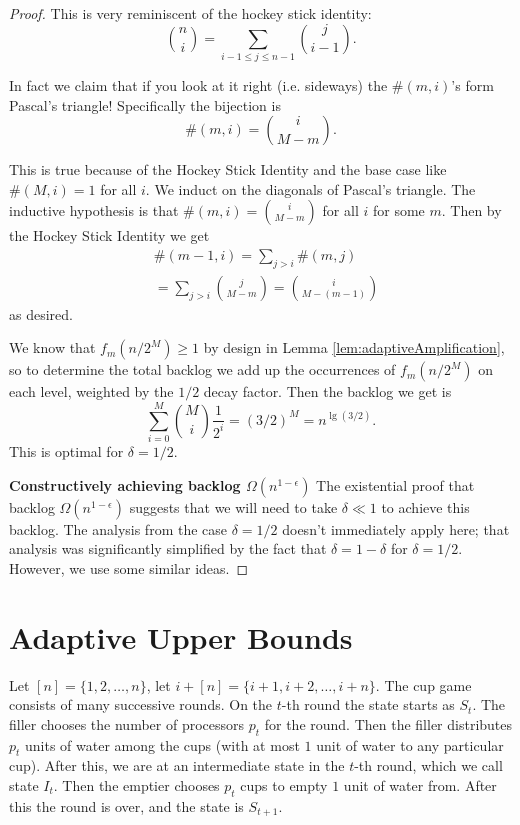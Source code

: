 \documentclass[twocolumn]{article}[11pt]
\begin{document}
\begin{proof}
  This is very reminiscent of the hockey stick identity:
  $${n \choose i} = \sum_{i-1\le j\le n-1} {j \choose i-1}.$$

  In fact we claim that if you look at it right (i.e. sideways) the $\#(m,
  i)$'s form Pascal's triangle!
  Specifically the bijection is 
  $$\#(m,i) = {i \choose M-m}.$$

  This is true because of the Hockey Stick Identity and the base case
  like $\#(M, i)=1$ for all $i$. We induct on the diagonals of Pascal's
  triangle. The inductive hypothesis is that $\#(m, i) = {i \choose M-m}$ for
  all $i$ for some $m$. Then by the Hockey Stick Identity we get 
  \begin{align*}
  &\#(m-1, i) = \sum_{j>i} \#(m,j) \\
  &= \sum_{j>i} {j \choose M-m} = {i \choose M-(m-1)}
  \end{align*}
  as desired.

  We know that $f_m(n/2^M) \ge 1$ by design in Lemma
  \ref{lem:adaptiveAmplification}, so to determine the total backlog we add up
  the occurrences of $f_m(n/2^M)$ on each level, weighted by the
  $1/2$ decay factor. Then the backlog we get is $$\sum_{i=0}^M {M \choose
  i}\frac{1}{2^i} = (3/2)^{M} = n^{\lg(3/2)}.$$
  This is optimal for $\delta= 1/2$.

  \textbf{Constructively achieving backlog $\Omega(n^{1-\epsilon})$}
  The existential proof that backlog $\Omega(n^{1-\epsilon})$ suggests that we
  will need to take $\delta \ll 1$ to achieve this backlog. The analysis from
  the case $\delta = 1/2$ doesn't immediately apply here; that analysis was
  significantly simplified by the fact that $\delta = 1-\delta$ for $\delta =
  1/2$. However, we use some similar ideas.


\end{proof}

\section{Adaptive Upper Bounds}\label{sec:adaptiveUpperBound}
Let $[n] = \{1,2,\ldots, n\}$, let $i+[n] = \{i+1, i+2, \ldots, i+n\}$.
The cup game consists of many successive rounds. On the $t$-th round the state
starts as $S_t$. The filler chooses the number of processors $p_t$ for the round. 
Then the filler distributes $p_t$ units of water among the cups (with at most
$1$ unit of water to any particular cup). After this, we are at an intermediate
state in the $t$-th round, which we call state $I_t$. Then the emptier chooses
$p_t$ cups to empty $1$ unit of water from. After this the round is over, and
the state is $S_{t+1}$.
\end{document}
